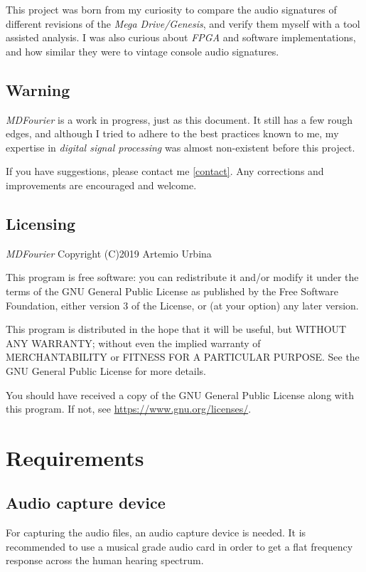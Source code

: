 \documentclass[10pt,a4paper]{report}
\begin{document}
This project was born from my curiosity to compare the audio signatures of different revisions of the  \textit{Mega Drive/Genesis}, and verify them myself with a tool assisted analysis. I was also curious about \textit{FPGA} and software implementations, and how similar they were to vintage console audio signatures.

\section{Warning}

\textit{MDFourier} is a work in progress, just as this document. It still has a few rough edges, and although I tried to adhere to the best practices known to me, my expertise in \textit{digital signal processing} was almost non-existent before this project. 

If you have suggestions, please contact me \ref{contact}. Any corrections and improvements are encouraged and welcome.

\section{Licensing}

\textit{MDFourier} Copyright (C)2019 Artemio Urbina

This program is free software: you can redistribute it and/or modify
it under the terms of the GNU General Public License as published by
the Free Software Foundation, either version 3 of the License, or
(at your option) any later version.

This program is distributed in the hope that it will be useful,
but WITHOUT ANY WARRANTY; without even the implied warranty of
MERCHANTABILITY or FITNESS FOR A PARTICULAR PURPOSE.  See the
GNU General Public License for more details.

You should have received a copy of the GNU General Public License
along with this program.  If not, see \url{https://www.gnu.org/licenses/}.

\chapter{Requirements}

\section{Audio capture device}

For capturing the audio files, an audio capture device is needed. It is recommended to use a musical grade audio card in order to get a flat frequency response across the human hearing spectrum.
\end{document}
